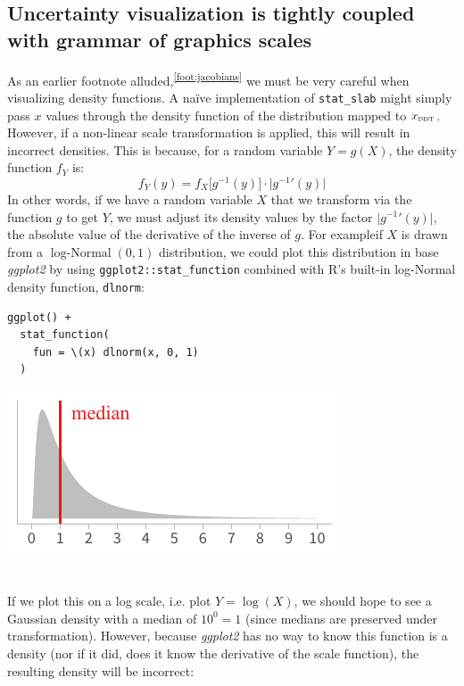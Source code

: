 \documentclass[journal]{vgtc}                     %
\providecommand{\DIFadd}[1]{{\protect\color{blue}\uwave{#1}}} %
\providecommand{\DIFaddbegin}{} %
\providecommand{\DIFaddend}{} %
\begin{document}
\subsection{Uncertainty visualization is tightly coupled\DIFaddbegin \\\DIFaddend with grammar of graphics scales}
\label{sec:jacobians}

As an earlier footnote alluded,\textsuperscript{\ref{foot:jacobians}}   we must be very careful when visualizing density functions. A na\"{i}ve implementation of \texttt{stat\_slab} might simply pass $x$ values through the density function of the distribution mapped to $x_\textsc{dist}$. However, if a non-linear scale transformation is applied, this will result in incorrect densities. This is because, for a random variable $Y = g(X)$, the density function $f_Y$ is:
\[
f_Y(y) = f_X\big[g^{-1}(y)\big] \cdot \big| {g^{-1}}'(y) \big|
\]
In other words, if we have a random variable $X$ that we transform via the function $g$ to get $Y$, we must adjust its density values by the factor $\lvert {g^{-1}}'(y) \rvert$, the absolute value of the derivative of the inverse of $g$. For example\DIFaddbegin \DIFadd{, }\DIFaddend if $X$ is drawn from a $\operatorname{log-Normal}(0, 1)$ distribution, we could plot this distribution in base \textit{ggplot2} by using \texttt{ggplot2::stat\_function} combined with R's built-in log-Normal density function, \texttt{dlnorm}:

\noindent
\begin{minipage}{.5\columnwidth}
\small
\begin{verbatim}
ggplot() +
  stat_function(
    fun = \(x) dlnorm(x, 0, 1)
  )
\end{verbatim}
\end{minipage}%
  \begin{minipage}{.4\columnwidth}
    \centering
    \includegraphics[width=1.2\columnwidth]{figs/3-jacobian-lognorm.pdf}
  \end{minipage}
\vspace{.5\belowdisplayskip}\\
If we plot this on a log scale, i.e. plot $Y = \log(X)$, we should hope to see a Gaussian density with a median of $10^0 = 1$ (since medians are preserved under transformation). However, because \textit{ggplot2} has no way to know this function is a density (nor if it did, does it know the derivative of the scale function), the resulting density will be incorrect:
\end{document}
